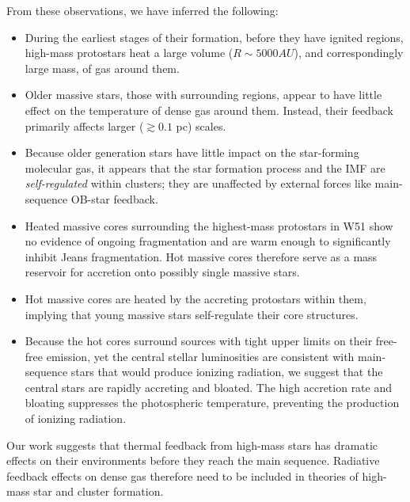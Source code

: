 \documentclass[twocolumn]{aastex61}
\begin{document}
From these observations, we have inferred the following: 
\begin{itemize}
    \item During the earliest stages of their formation, before they have 
        ignited \hii regions, high-mass protostars heat a large volume
        ($R\sim5000 AU$), and correspondingly large mass, of gas around them.
    \item Older massive stars, those with surrounding \hii regions, appear
        to have little effect on the temperature of dense gas around them.
        Instead, their feedback primarily affects larger ($\gtrsim 0.1$ pc)
        scales.
    \item Because older generation stars have little impact on the star-forming
        molecular gas, it appears that the star formation process and the IMF
        are \emph{self-regulated} within clusters; they are unaffected by
        external forces like main-sequence OB-star feedback.
    \item Heated massive cores surrounding the highest-mass protostars in
        W51 show no evidence of ongoing fragmentation and are warm enough
        to significantly inhibit Jeans fragmentation.  Hot massive cores
        therefore serve as a mass reservoir for accretion onto possibly single
        massive stars.
    \item Hot massive cores are heated by the accreting protostars within them,
        implying that young massive stars self-regulate their core structures.
    \item Because the hot cores surround sources with tight upper limits
        on their free-free emission, yet the central stellar luminosities
        are consistent with main-sequence stars that would produce ionizing
        radiation, we suggest that the central stars are rapidly accreting and
        bloated.  The high accretion rate and bloating suppresses the
        photospheric temperature, preventing the production of ionizing
        radiation.
\end{itemize}

Our work suggests that thermal feedback from high-mass stars has dramatic
effects on their environments before they reach the main sequence.  Radiative
feedback effects on dense gas therefore need to be included in theories of
high-mass star and cluster formation.
\end{document}
